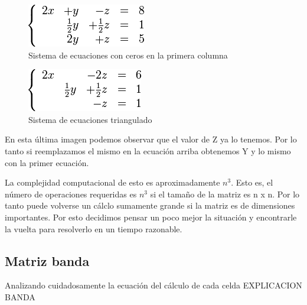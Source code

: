 \begin{figure}[htb]
\begin{center}
\includegraphics[scale=0.70]{imagenes/ejemplo_gaus_2.png} 
\caption{Sistema de ecuaciones con ceros en la primera columna} 
\end{center}
\end{figure}

\begin{figure}[htb]
\begin{center}
\includegraphics[scale=0.70]{imagenes/ejemplo_gaus_3.png} 
\caption{Sistema de ecuaciones triangulado} 
\end{center}
\end{figure}
\newpage
En esta última imagen podemos observar que el valor de Z ya lo tenemos. Por lo tanto si reemplazamos el mismo en la ecuación arriba obtenemos Y y lo mismo con la primer ecuación.

La complejidad computacional de esto es aproximadamente $n^3$. Esto es, el número de operaciones requeridas es $n^3$ si el tamaño de la matriz es n x n. Por lo tanto puede volverse un cálclo sumamente grande si la matriz es de dimensiones importantes. Por esto decidimos pensar un poco mejor la situación y encontrarle la vuelta para resolverlo en un tiempo razonable. 

\subsection{Matriz banda}

Analizando cuidadosamente la ecuación del cálculo de cada celda EXPLICACION BANDA 







